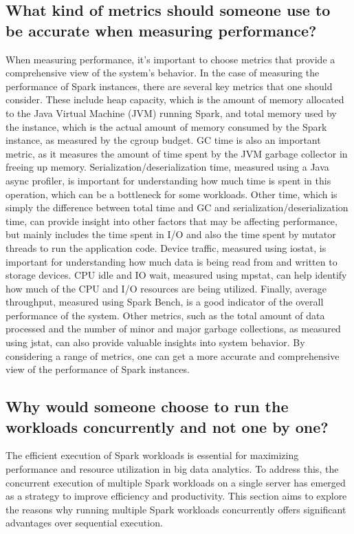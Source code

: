 \subsection{What kind of metrics should someone use to be
accurate when measuring performance?} When measuring performance, it's
important to choose metrics that provide a comprehensive view of the
system's behavior. In the case of measuring the performance of Spark
instances, there are several key metrics that one should consider.
These include heap capacity, which is the amount of memory allocated
to the Java Virtual Machine (JVM) running Spark, and total memory used
by the instance, which is the actual amount of memory consumed by the
Spark instance, as measured by the cgroup budget. GC time is also an
important metric, as it measures the amount of time spent by the JVM
garbage collector in freeing up memory. Serialization/deserialization
time, measured using a Java async profiler, is important for
understanding how much time is spent in this operation, which can be a
bottleneck for some workloads. Other time, which is simply the
difference between total time and GC and serialization/deserialization
time, can provide insight into other factors that may be affecting
performance, but mainly includes the time spent in I/O and also the
time spent by mutator threads to run the application code. Device
traffic, measured using iostat, is important for understanding how
much data is being read from and written to storage devices. CPU idle
and IO wait, measured using mpstat, can help identify how much of the
CPU and I/O resources are being utilized. Finally, average throughput,
measured using Spark Bench, is a good indicator of the overall
performance of the system. Other metrics, such as the total amount of
data processed and the number of minor and major garbage collections,
as measured using jstat, can also provide valuable insights into
system behavior. By considering a range of metrics, one can get a more
accurate and comprehensive view of the performance of Spark instances.

\subsection{Why would someone choose to run the workloads
concurrently and not one by one?} The efficient execution of Spark
workloads is essential for maximizing performance and resource
utilization in big data analytics. To address this, the concurrent
execution of multiple Spark workloads on a single server has emerged
as a strategy to improve efficiency and productivity. This section
aims to explore the reasons why running multiple Spark workloads
concurrently offers significant advantages over sequential execution.

